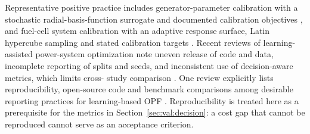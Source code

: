 Representative positive practice includes generator-parameter
calibration with a stochastic radial-basis-function surrogate and
documented calibration objectives \cite{Khazeiynasab2021}, and fuel-cell
system calibration with an adaptive response surface, Latin hypercube
sampling and stated calibration targets \cite{Zhang2025__7}. Recent
reviews of learning-assisted power-system optimization note uneven
release of code and data, incomplete reporting of splits and seeds,
and inconsistent use of decision-aware metrics, which limits cross-
study comparison
\cite{Ruan2021221,Khaloie2025,Lim2025,Mylonopoulos202332697}. One
review explicitly lists reproducibility, open-source code and
benchmark comparisons among desirable reporting practices for
learning-based OPF \cite{Khaloie2025}. Reproducibility is treated here
as a prerequisite for the metrics in Section~\ref{sec:val:decision}:
a cost gap that cannot be reproduced cannot serve as an acceptance
criterion.

